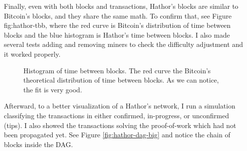 Finally, even with both blocks and transactions, Hathor's blocks are similar to Bitcoin's blocks, and they share the same math. To confirm that, see Figure {fig:hathor-tbb}, where the red curve is Bitcoin's distribution of time between blocks and the blue histogram is Hathor's time between blocks. I also made several tests adding and removing miners to check the difficulty adjustment and it worked properly.

\begin{figure}[!htb]
\centering
{}

\caption{Histogram of time between blocks. The red curve the Bitcoin's theoretical distribution of time between blocks. As we can notice, the fit is very good. \label{fig:hathor-tbb}}
\end{figure}

Afterward, to a better visualization of a Hathor's network, I run a simulation classifying the transactions in either confirmed, in-progress, or unconfirmed (tips). I also showed the transactions solving the proof-of-work which had not been propagated yet. See Figure \ref{fig:hathor-dag-big} and notice the chain of blocks inside the DAG.

